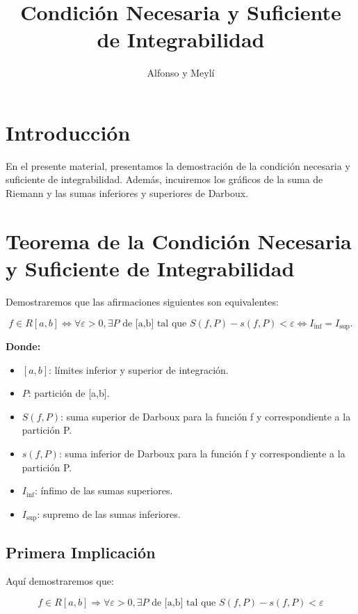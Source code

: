 \documentclass[a4paper,12pt]{article}
\title{Condición Necesaria y Suficiente de Integrabilidad}
\author{Alfonso y Meylí }
\date{}
\begin{document}
	
	\maketitle
	
	\section{Introducción}
	En el presente material, presentamos la demostración de la condición necesaria y suficiente de integrabilidad. Además, incuiremos los gráficos de la suma de Riemann y las sumas inferiores y superiores de Darboux.
	
	\section{Teorema de la Condición Necesaria y Suficiente de Integrabilidad}
	Demostraremos que las afirmaciones siguientes son equivalentes:
	
	\[
	f \in R[a,b] \iff \forall \varepsilon > 0, \exists P \text{ de [a,b] tal que }   S(f,P) - s(f,P) < \varepsilon \iff I_{\text{inf}} = I_{\text{sup}}.
	\]
	
	
	\textbf{Donde:}
	\begin{itemize}
		\item \( [a,b] \): límites inferior y superior de integración.
		\item \( P \): partición de [a,b].
		\item \( S(f,P) \): suma superior de Darboux para la función f y correspondiente a la partición P.
		\item \( s(f,P) \): suma inferior de Darboux para la función f y correspondiente a la partición P.
		\item \( I_{\text{inf}} \): ínfimo de las sumas superiores.
		\item \( I_{\text{sup}} \): supremo de las sumas inferiores.
	\end{itemize}
	
	\subsection{Primera Implicación}


	Aquí demostraremos que:
	
	
	
	\[
	f \in R[a,b] \Rightarrow \forall \varepsilon > 0, \exists P \text{ de [a,b] tal que  }   S(f,P) - s(f,P) < \varepsilon 
	\]
	
	
	
\end{document}
